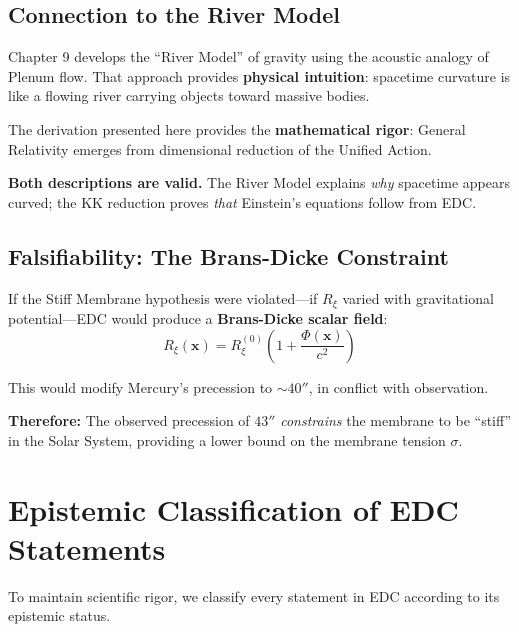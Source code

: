 \subsection{Connection to the River Model}

Chapter 9 develops the ``River Model'' of gravity using the acoustic analogy of Plenum flow. That approach provides \textbf{physical intuition}: spacetime curvature is like a flowing river carrying objects toward massive bodies.

The derivation presented here provides the \textbf{mathematical rigor}: General Relativity emerges from dimensional reduction of the Unified Action.

\textbf{Both descriptions are valid.} The River Model explains \textit{why} spacetime appears curved; the KK reduction proves \textit{that} Einstein's equations follow from EDC.

\subsection{Falsifiability: The Brans-Dicke Constraint}

If the Stiff Membrane hypothesis were violated---if $R_\xi$ varied with gravitational potential---EDC would produce a \textbf{Brans-Dicke scalar field}:
\begin{equation}
R_\xi(\mathbf{x}) = R_\xi^{(0)}\left(1 + \frac{\Phi(\mathbf{x})}{c^2}\right)
\end{equation}

This would modify Mercury's precession to $\sim 40''$, in conflict with observation.

\textbf{Therefore:} The observed precession of $43''$ \textit{constrains} the membrane to be ``stiff'' in the Solar System, providing a lower bound on the membrane tension $\sigma$.

\newpage

\section{Epistemic Classification of EDC Statements}
\label{sec:epistemic}

To maintain scientific rigor, we classify every statement in EDC according to its epistemic status.

